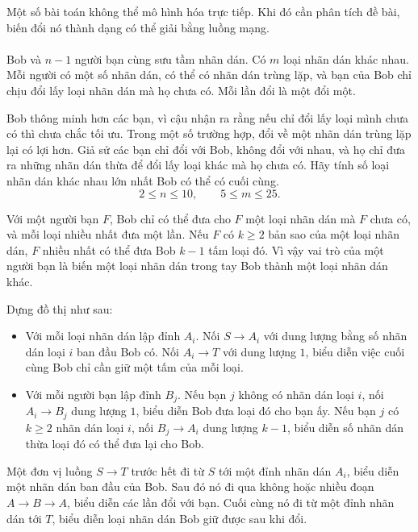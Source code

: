 \documentclass[11pt]{article}
\begin{document}
Một số bài toán không thể mô hình hóa trực tiếp. Khi đó cần phân tích đề bài,
biến đổi nó thành dạng có thể giải bằng luồng mạng.

\paragraph{}
Bob và \(n-1\) người bạn cùng sưu tầm nhãn dán. Có \(m\) loại nhãn dán khác
nhau. Mỗi người có một số nhãn dán, có thể có nhãn dán trùng lặp, và bạn của
Bob chỉ chịu đổi lấy loại nhãn dán mà họ chưa có. Mỗi lần đổi là một đổi một.

Bob thông minh hơn các bạn, vì cậu nhận ra rằng nếu chỉ đổi lấy loại mình
chưa có thì chưa chắc tối ưu. Trong một số trường hợp, đổi về một nhãn dán
trùng lặp lại có lợi hơn. Giả sử các bạn chỉ đổi với Bob, không đổi với nhau,
và họ chỉ đưa ra những nhãn dán thừa để đổi lấy loại khác mà họ chưa có. Hãy
tính số loại nhãn dán khác nhau lớn nhất Bob có thể có cuối cùng.
\[
  2\le n\le 10,\qquad 5\le m\le 25.
\]

Với một người bạn \(F\), Bob chỉ có thể đưa cho \(F\) một loại nhãn dán mà
\(F\) chưa có, và mỗi loại nhiều nhất đưa một lần. Nếu \(F\) có \(k\ge 2\)
bản sao của một loại nhãn dán, \(F\) nhiều nhất có thể đưa Bob \(k-1\) tấm
loại đó. Vì vậy vai trò của một người bạn là biến một loại nhãn dán trong tay
Bob thành một loại nhãn dán khác.

Dựng đồ thị như sau:
\begin{itemize}
  \item Với mỗi loại nhãn dán lập đỉnh \(A_i\). Nối \(S\to A_i\) với dung
  lượng bằng số nhãn dán loại \(i\) ban đầu Bob có. Nối \(A_i\to T\) với dung
  lượng \(1\), biểu diễn việc cuối cùng Bob chỉ cần giữ một tấm của mỗi loại.
  \item Với mỗi người bạn lập đỉnh \(B_j\). Nếu bạn \(j\) không có nhãn dán
  loại \(i\), nối \(A_i\to B_j\) dung lượng \(1\), biểu diễn Bob đưa loại đó
  cho bạn ấy. Nếu bạn \(j\) có \(k\ge 2\) nhãn dán loại \(i\), nối
  \(B_j\to A_i\) dung lượng \(k-1\), biểu diễn số nhãn dán thừa loại đó có
  thể đưa lại cho Bob.
\end{itemize}

Một đơn vị luồng \(S\to T\) trước hết đi từ \(S\) tới một đỉnh nhãn dán
\(A_i\), biểu diễn một nhãn dán ban đầu của Bob. Sau đó nó đi qua không hoặc
nhiều đoạn \(A\to B\to A\), biểu diễn các lần đổi với bạn. Cuối cùng nó đi từ
một đỉnh nhãn dán tới \(T\), biểu diễn loại nhãn dán Bob giữ được sau khi đổi.
\end{document}
